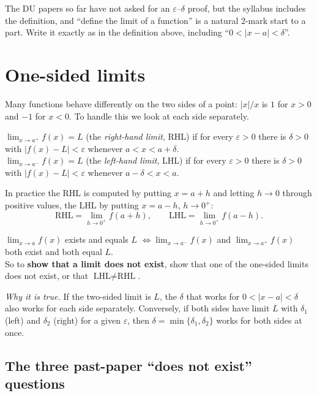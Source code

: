 \begin{tipbox}
The DU papers so far have not asked for an $\varepsilon$--$\delta$ proof, but the syllabus includes the definition, and ``define the limit of a function'' is a natural 2-mark start to a part. Write it exactly as in the definition above, including ``$0<|x-a|<\delta$''.
\end{tipbox}

\section{One-sided limits}\label{sec:lim-onesided}

Many functions behave differently on the two sides of a point: $|x|/x$ is $1$ for $x>0$ and $-1$ for $x<0$. To handle this we look at each side separately.

\begin{definition}
$\lim_{x\to a^+}f(x)=L$ (the \emph{right-hand limit}, RHL) if for every $\varepsilon>0$ there is $\delta>0$ with $|f(x)-L|<\varepsilon$ whenever $a<x<a+\delta$.\\
$\lim_{x\to a^-}f(x)=L$ (the \emph{left-hand limit}, LHL) if for every $\varepsilon>0$ there is $\delta>0$ with $|f(x)-L|<\varepsilon$ whenever $a-\delta<x<a$.
\end{definition}
In practice the RHL is computed by putting $x=a+h$ and letting $h\to0$ through positive values, the LHL by putting $x=a-h$, $h\to0^+$:
\[
\text{RHL}=\lim_{h\to0^+}f(a+h),\qquad \text{LHL}=\lim_{h\to0^+}f(a-h).
\]
\begin{keybox}
$\displaystyle\lim_{x\to a}f(x)$ exists and equals $L$ \quad$\iff$\quad $\displaystyle\lim_{x\to a^-}f(x)$ and $\displaystyle\lim_{x\to a^+}f(x)$ both exist and both equal $L$.\\[4pt]
So to \textbf{show that a limit does not exist}, show that one of the one-sided limits does not exist, or that $\text{LHL}\ne\text{RHL}$.
\end{keybox}
\emph{Why it is true.} If the two-sided limit is $L$, the $\delta$ that works for $0<|x-a|<\delta$ also works for each side separately. Conversely, if both sides have limit $L$ with $\delta_1$ (left) and $\delta_2$ (right) for a given $\varepsilon$, then $\delta=\min\{\delta_1,\delta_2\}$ works for both sides at once.

\subsection{The three past-paper ``does not exist'' questions}

